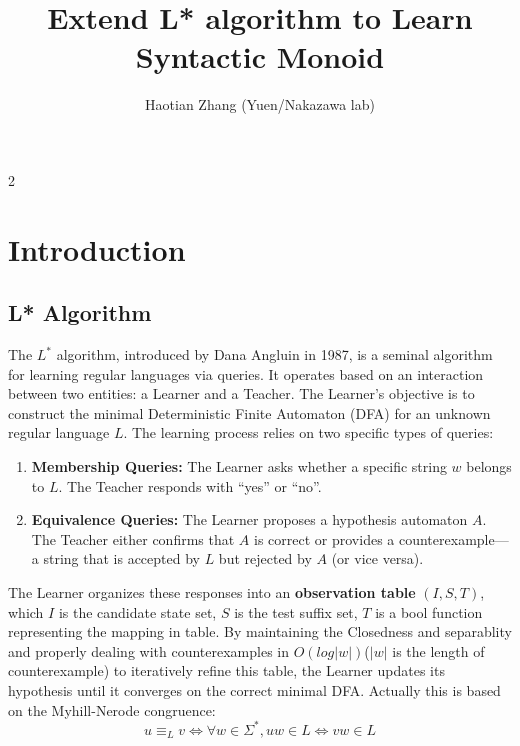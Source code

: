 \documentclass[10pt, a4paper]{article} %
\title{\textbf{Extend L* algorithm to Learn Syntactic Monoid}} %
\author{Haotian Zhang (Yuen/Nakazawa lab)}     %
\date{}
\begin{document}
\maketitle
\thispagestyle{empty}

\begin{multicols}{2} %

\section{Introduction}
\subsection{L* Algorithm}
    The $L^*$ algorithm, introduced by Dana Angluin in 1987, is a seminal algorithm for learning regular languages via queries. \cite{angluin87}
    It operates based on an interaction between two entities: a Learner and a Teacher. The Learner's objective is to construct the minimal Deterministic Finite Automaton (DFA) for an unknown regular language $L$.
    The learning process relies on two specific types of queries:
\begin{enumerate}[leftmargin=*]
    \item \textbf{Membership Queries:} The Learner asks whether a specific string $w$ belongs to $L$. The Teacher responds with ``yes'' or ``no''.
    \item \textbf{Equivalence Queries:} The Learner proposes a hypothesis automaton $A$. The Teacher either confirms that $A$ is correct or provides a counterexample---a string that is accepted by $L$ but rejected by $A$ (or vice versa).
\end{enumerate}

    The Learner organizes these responses into an \textbf{observation table} $(I,S,T)$, which $I$ is the candidate state set, $S$ is the test suffix set, $T$ is a bool function representing the mapping in table. By maintaining the Closedness and separablity and properly dealing with counterexamples in $O(log|w|)$($|w|$ is the length of counterexample) \cite{Worrell:DFALearning} to iteratively refine this table, the Learner updates its hypothesis until it converges on the correct minimal DFA. Actually this is based on the Myhill-Nerode congruence: 
\begin{equation}
    u \equiv_L v \iff \forall w \in \Sigma^*, uw \in L \Leftrightarrow vw \in L
\end{equation}


\end{multicols}
\end{document}
